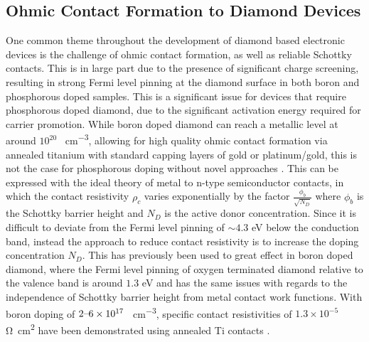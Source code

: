 \begin{refsection}
\subsection{Ohmic Contact Formation to Diamond Devices}
One common theme throughout the development of diamond based electronic devices is the challenge of ohmic contact formation, as well as reliable Schottky contacts. This is in large part due to the presence of significant charge screening, resulting in strong Fermi level pinning at the diamond surface in both boron \cite{baker1993} and phosphorous \cite{suzuki2006} doped samples. This is a significant issue for devices that require phosphorous doped diamond, due to the significant activation energy required for carrier promotion. While boron doped diamond can reach a metallic level at around $10^{20}$ \si{\atoms\per\centi\metre\cubed}, allowing for high quality ohmic contact formation via annealed titanium with standard capping layers of gold or platinum/gold, this is not the case for phosphorous doping without novel approaches \cite{valappil2023}. This can be expressed with the ideal theory of metal to n-type semiconductor contacts, in which the contact resistivity $\rho_{c}$ varies exponentially by the factor $\frac{\phi_{b}}{\sqrt{N_{D}}}$ where $\phi_{b}$ is the Schottky barrier height and $N_{D}$ is the active donor concentration. Since it is difficult to deviate from the Fermi level pinning of $\sim4.3$ \si{\electronvolt} below the conduction band, instead the approach to reduce contact resistivity is to increase the doping concentration $N_{D}$. This has previously been used to great effect in boron doped diamond, where the Fermi level pinning of oxygen terminated diamond relative to the valence band is around $1.3$ \si{\electronvolt} \cite{yamanaka2000} and has the same issues with regards to the independence of Schottky barrier height from metal contact work functions. With boron doping of $2\text{\textendash}6\times10^{17}$ \si{\atoms\per\centi\metre\cubed}, specific contact resistivities of $1.3\times10^{-5}$ \si{\ohm\centi\metre\squared} have been demonstrated using annealed Ti contacts \cite{chen2005}.


\end{refsection}
